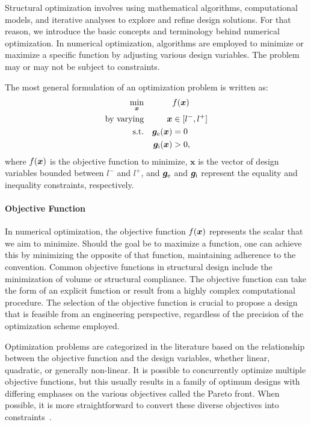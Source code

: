Structural optimization involves using mathematical algorithms, computational models, and iterative analyses to explore and refine design solutions. For that reason, we introduce the basic concepts and terminology behind numerical optimization. In numerical optimization, algorithms are employed to minimize or maximize a specific function by adjusting various design variables. The problem may or may not be subject to constraints. 

The most general formulation of an optimization problem is written as:
\begin{equation}
    \begin{aligned}
    \min_{\bm{x}}         && & f(\bm{x})\\
    \textrm{by varying}   && \bm{x} &\in [l^-,l^+] \\
    \textrm{s.t.}   && \bm{g}_\text{e}(\bm{x}) &= 0 \\
    && \bm{g}_\text{i}(\bm{x}) &> 0, \\
    \end{aligned}
\end{equation}
where $ f(\bm{x}) $ is the objective function to minimize, $ \bm{x} $ is the vector of design variables bounded between $ l^- $ and $ l^+ $, and $\bm{g}_\text{e}$ and $\bm{g}_\text{i}$ represent the equality and inequality constraints, respectively.

\paragraph{Objective Function}
In numerical optimization, the objective function $f(\bm{x})$ represents the scalar that we aim to minimize. Should the goal be to maximize a function, one can achieve this by minimizing the opposite of that function, maintaining adherence to the convention. Common objective functions in structural design include the minimization of volume or structural compliance. The objective function can take the form of an explicit function or result from a highly complex computational procedure. The selection of the objective function is crucial to propose a design that is feasible from an engineering perspective, regardless of the precision of the optimization scheme employed.

Optimization problems are categorized in the literature based on the relationship between the objective function and the design variables, whether linear, quadratic, or generally non-linear. It is possible to concurrently optimize multiple objective functions, but this usually results in a family of optimum designs with differing emphases on the various objectives called the Pareto front. When possible, it is more straightforward to convert these diverse objectives into constraints~.

